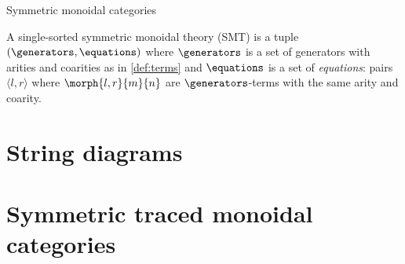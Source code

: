 Symmetric monoidal categories

\begin{definition}
    A single-sorted symmetric monoidal theory (SMT) is a tuple \(
        (\generators, \equations)
    \) where \(\generators\) is a set of generators with arities and coarities
    as in \cref{def:terms} and \(\equations\) is a set of \emph{equations}:
    pairs \(\langle l, r\rangle\) where \(\morph{l, r}{m}{n}\) are
    \(\generators\)-terms with the same arity and coarity.
\end{definition}

\section{String diagrams}

\section{Symmetric traced monoidal categories}